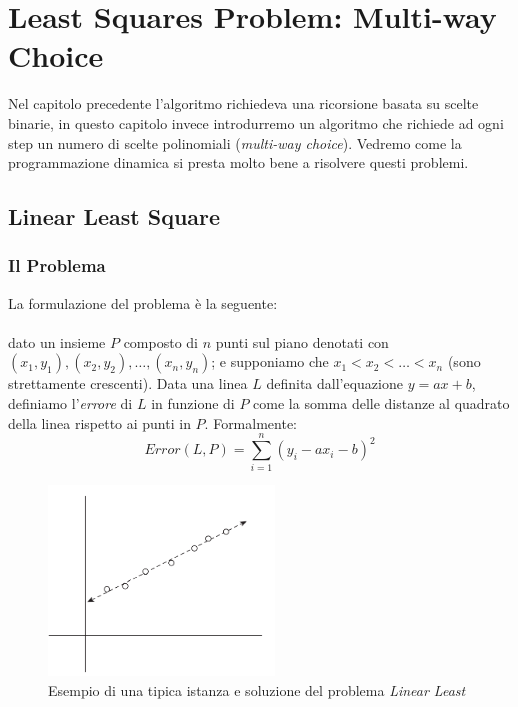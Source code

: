 \section{Least Squares Problem: Multi-way Choice }

Nel capitolo precedente l'algoritmo richiedeva una ricorsione basata su scelte
binarie, in questo capitolo invece introdurremo un algoritmo che richiede ad
ogni step un numero di scelte polinomiali (\textit{multi-way choice}). Vedremo
come la programmazione dinamica si presta molto bene a risolvere questi
problemi.

\subsection{Linear Least Square}

\subsubsection{Il Problema}

La formulazione del problema è la seguente:

\paragraph*{} dato un insieme $P$ composto di $n$ punti sul piano denotati con\\
$(x_1, y_1), (x_2, y_2), \ldots, (x_n, y_n)$; e supponiamo che $x_1 < x_2 <
    \ldots < x_n$ (sono strettamente crescenti). Data una linea $L$ definita
dall'equazione $y = ax + b$, definiamo l'\textit{errore} di $L$ in funzione
di $P$ come la somma delle distanze al quadrato della linea rispetto ai
punti in $P$. Formalmente:
\[
    Error(L, P) = \sum_{i=1}^{n} (y_i - ax_i - b)^2
\]

\begin{figure}[H]
    \centering
    \includegraphics[width=6cm, keepaspectratio]{capitoli/dynamic_programming/imgs/linear_least.png}
    \caption{Esempio di una tipica istanza e soluzione del problema
        \textit{Linear Least}}
\end{figure}

